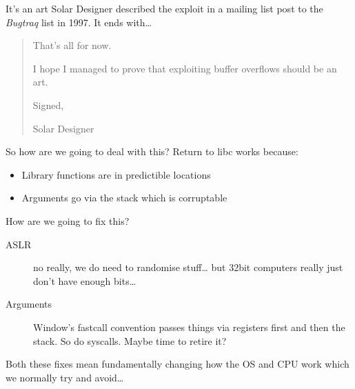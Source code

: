 \documentclass[9pt,aspectratio=169]{beamer}
\begin{document}
\begin{frame}[label={sec:org31b9d1a}]{It's an art}
Solar Designer described the exploit in a mailing list post to the \emph{Bugtraq} list in 1997.
It ends with\ldots{}

\begin{quote}
That's all for now.

I hope I managed to prove that exploiting buffer overflows should be an art.

Signed,

Solar Designer
\end{quote}
\end{frame}
\begin{frame}[label={sec:org7fff112}]{So how are we going to deal with this?}
Return to libc works because:
\begin{itemize}
\item Library functions are in predictible locations
\item Arguments go via the stack which is corruptable
\end{itemize}
\begin{block}{How are we going to fix this?}
\begin{description}
\item[{ASLR}] no really, we do need to randomise stuff\ldots{} but 32bit computers really just don't have enough bits\ldots{}
\item[{Arguments}] Window's fastcall convention passes things via registers first and then the stack. So do syscalls.  Maybe time to retire it?
\end{description}

Both these fixes mean fundamentally changing how the OS and CPU work which we normally try and avoid\ldots{}
\end{block}
\end{frame}
\end{document}
